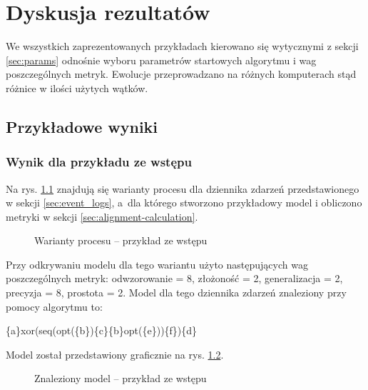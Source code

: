 \chapter{Dyskusja rezultatów}

We wszystkich zaprezentowanych przykładach kierowano się wytycznymi z sekcji \ref{sec:params} odnośnie wyboru parametrów startowych algorytmu i wag poszczególnych metryk. Ewolucje przeprowadzano na różnych komputerach stąd różnice w ilości użytych wątków.

\section{Przykładowe wyniki}
\subsection{Wynik dla przykładu ze wstępu}
Na rys. \ref{fig:p1_variants} znajdują się warianty procesu dla dziennika zdarzeń przedstawionego w sekcji \ref{sec:event_logs}, a~dla którego stworzono przykładowy model i obliczono metryki w sekcji \ref{sec:alignment-calculation}. 
\begin{figure}[!ht]
	\caption{\label{fig:p1_variants}Warianty procesu -- przykład ze wstępu}
\end{figure}

Przy odkrywaniu modelu dla tego wariantu użyto następujących wag poszczególnych metryk: odwzorowanie = 8, złożoność = 2, generalizacja = 2, precyzja = 8, prostota = 2. Model dla tego dziennika zdarzeń znaleziony przy pomocy algorytmu to:
\begin{center}
	\{a\}xor(seq(opt(\{b\})\{c\}\{b\}opt(\{e\}))\{f\})\{d\}
\end{center}
Model został przedstawiony graficznie na rys. \ref{fig:p1_model}.

\begin{figure}[!ht]
	\caption{\label{fig:p1_model}Znaleziony model -- przykład ze wstępu}
\end{figure}

